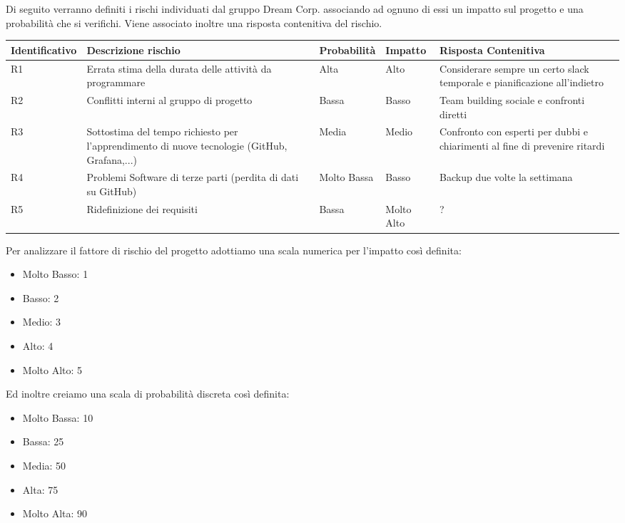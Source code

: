 \documentclass[12pt]{article}
\begin{document}
		Di seguito verranno definiti i rischi individuati dal gruppo Dream Corp. associando ad ognuno di essi un impatto sul progetto e una probabilità che si verifichi. Viene associato inoltre una risposta contenitiva del rischio. 
		\newline \newline
		\begin{tabularx}{\textwidth}{|X|X|X|X|X|}
			\hline
			\textbf{Identificativo} & \textbf{Descrizione rischio} & \textbf{Probabilità} & \textbf{Impatto} & \textbf{Risposta Contenitiva}\\
			\hline
			R1 & Errata stima della durata delle attività da programmare & Alta & Alto & Considerare sempre un certo slack temporale e pianificazione all’indietro\\
			\hline
			R2 & Conflitti interni al gruppo di progetto & Bassa & Basso & Team building sociale e confronti diretti\\
			\hline
			R3 & Sottostima del tempo richiesto per l’apprendimento di nuove tecnologie (GitHub, Grafana,...) & Media & Medio & Confronto con esperti per dubbi e chiarimenti al fine di prevenire ritardi\\
			\hline
			R4 & Problemi Software di terze parti (perdita di dati su GitHub) & Molto  Bassa & Basso &  Backup due volte la settimana\\
			\hline
			R5 & Ridefinizione dei requisiti & Bassa & Molto Alto & ?\\
			\hline
		\end{tabularx}
		\newline \newline
		Per analizzare il fattore di rischio del progetto adottiamo una scala numerica per l’impatto così definita:
		\begin{itemize}
			\item Molto Basso: 1
			\item Basso: 2
			\item Medio: 3
			\item Alto: 4
			\item Molto Alto: 5
		\end{itemize}
		Ed inoltre creiamo una scala di probabilità discreta così definita:
		\begin{itemize}
			\item Molto Bassa: 10%
			\item Bassa: 25%
			\item Media: 50%
			\item Alta: 75%
			\item Molto Alta: 90%
		\end{itemize}
\end{document}

